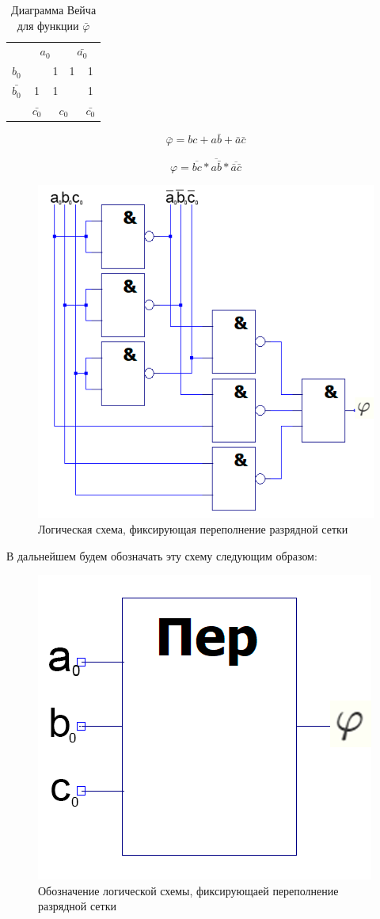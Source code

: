 \documentclass[a4paper,14pt]{article}
\begin{document}
\begin{table}[H]
	\begin{center}
		\caption{\label{tab:perSet_ve} Диаграмма Вейча для функции  $\bar{\varphi}$}

\begin{tabular}{ccccc}
	& \multicolumn{2}{c}{$a_0$}                           & \multicolumn{2}{c}{$\bar{a_0}$}                          \\ \cline{2-5} 
	\multicolumn{1}{c|}{$b_0$}  & \multicolumn{1}{c|}{}  & \multicolumn{1}{c|}{1} & \multicolumn{1}{c|}{1} & \multicolumn{1}{c|}{1} \\ \cline{2-5} 
	\multicolumn{1}{c|}{$\bar{b_0}$} & \multicolumn{1}{c|}{1} & \multicolumn{1}{c|}{1} & \multicolumn{1}{c|}{}  & \multicolumn{1}{c|}{1} \\ \cline{2-5} 
	& $\bar{c_0}$                    & \multicolumn{2}{c}{$c_0$}                           & $\bar{c_0}$                   
\end{tabular}
\end{center}
\end{table}

$$\bar\varphi = bc + a\bar{b} + \bar{a}\bar{c}$$

$$\varphi = \overline{bc} *  \overline{a\bar{b}} * \overline{\bar{a}\bar{c}}$$

\begin{figure}[H]
	\centering
	\includegraphics[width=0.6\linewidth]{images/perep_sh}
	\caption{Логическая схема, фиксирующая переполнение разрядной сетки}
	\label{fig:perep_sh}
\end{figure}

В дальнейшем будем обозначать эту схему следующим образом:

\begin{figure}[H]
	\centering
	\includegraphics[width=0.4\linewidth]{images/perep_el}
	\caption{Обозначение логической схемы, фиксирующаей переполнение разрядной сетки}
	\label{fig:perep_el}
\end{figure}
\end{document}
